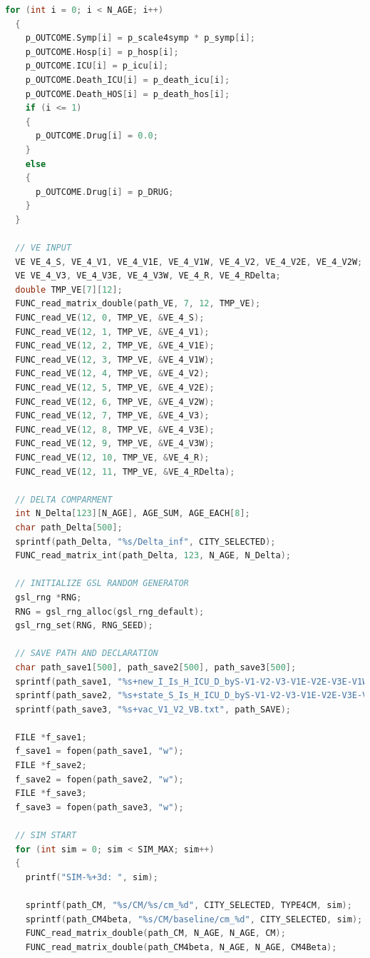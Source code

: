 \documentclass[bwprint]{gmcmthesis}
\numberwithin{figure}{section}
\begin{document}
\begin{lstlisting}[language=C]
  for (int i = 0; i < N_AGE; i++)
  {
    p_OUTCOME.Symp[i] = p_scale4symp * p_symp[i];
    p_OUTCOME.Hosp[i] = p_hosp[i];
    p_OUTCOME.ICU[i] = p_icu[i];
    p_OUTCOME.Death_ICU[i] = p_death_icu[i];
    p_OUTCOME.Death_HOS[i] = p_death_hos[i];
    if (i <= 1)
    {
      p_OUTCOME.Drug[i] = 0.0;
    }
    else
    {
      p_OUTCOME.Drug[i] = p_DRUG;
    }
  }

  // VE INPUT
  VE VE_4_S, VE_4_V1, VE_4_V1E, VE_4_V1W, VE_4_V2, VE_4_V2E, VE_4_V2W;
  VE VE_4_V3, VE_4_V3E, VE_4_V3W, VE_4_R, VE_4_RDelta;
  double TMP_VE[7][12];
  FUNC_read_matrix_double(path_VE, 7, 12, TMP_VE);
  FUNC_read_VE(12, 0, TMP_VE, &VE_4_S);
  FUNC_read_VE(12, 1, TMP_VE, &VE_4_V1);
  FUNC_read_VE(12, 2, TMP_VE, &VE_4_V1E);
  FUNC_read_VE(12, 3, TMP_VE, &VE_4_V1W);
  FUNC_read_VE(12, 4, TMP_VE, &VE_4_V2);
  FUNC_read_VE(12, 5, TMP_VE, &VE_4_V2E);
  FUNC_read_VE(12, 6, TMP_VE, &VE_4_V2W);
  FUNC_read_VE(12, 7, TMP_VE, &VE_4_V3);
  FUNC_read_VE(12, 8, TMP_VE, &VE_4_V3E);
  FUNC_read_VE(12, 9, TMP_VE, &VE_4_V3W);
  FUNC_read_VE(12, 10, TMP_VE, &VE_4_R);
  FUNC_read_VE(12, 11, TMP_VE, &VE_4_RDelta);

  // DELTA COMPARMENT
  int N_Delta[123][N_AGE], AGE_SUM, AGE_EACH[8];
  char path_Delta[500];
  sprintf(path_Delta, "%s/Delta_inf", CITY_SELECTED);
  FUNC_read_matrix_int(path_Delta, 123, N_AGE, N_Delta);

  // INITIALIZE GSL RANDOM GENERATOR
  gsl_rng *RNG;
  RNG = gsl_rng_alloc(gsl_rng_default);
  gsl_rng_set(RNG, RNG_SEED);

  // SAVE PATH AND DECLARATION
  char path_save1[500], path_save2[500], path_save3[500];
  sprintf(path_save1, "%s+new_I_Is_H_ICU_D_byS-V1-V2-V3-V1E-V2E-V3E-V1W-V2W-V3W-R-RDelta.txt", path_SAVE);
  sprintf(path_save2, "%s+state_S_Is_H_ICU_D_byS-V1-V2-V3-V1E-V2E-V3E-V1W-V2W-V3W-R-RDelta.txt", path_SAVE);
  sprintf(path_save3, "%s+vac_V1_V2_VB.txt", path_SAVE);

  FILE *f_save1;
  f_save1 = fopen(path_save1, "w");
  FILE *f_save2;
  f_save2 = fopen(path_save2, "w");
  FILE *f_save3;
  f_save3 = fopen(path_save3, "w");

  // SIM START
  for (int sim = 0; sim < SIM_MAX; sim++)
  {
    printf("SIM-%+3d: ", sim);

    sprintf(path_CM, "%s/CM/%s/cm_%d", CITY_SELECTED, TYPE4CM, sim);
    sprintf(path_CM4beta, "%s/CM/baseline/cm_%d", CITY_SELECTED, sim);
    FUNC_read_matrix_double(path_CM, N_AGE, N_AGE, CM);
    FUNC_read_matrix_double(path_CM4beta, N_AGE, N_AGE, CM4Beta);


\end{lstlisting}
\end{document}
